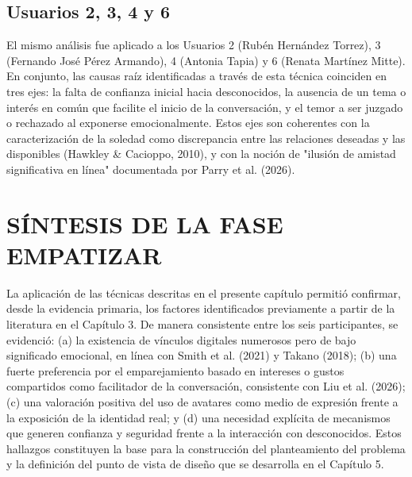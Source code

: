 \subsection{Usuarios 2, 3, 4 y 6}
El mismo análisis fue aplicado a los Usuarios 2 (Rubén Hernández Torrez), 3 (Fernando José Pérez Armando), 4 (Antonia Tapia) y 6 (Renata Martínez Mitte). En conjunto, las causas raíz identificadas a través de esta técnica coinciden en tres ejes: la falta de confianza inicial hacia desconocidos, la ausencia de un tema o interés en común que facilite el inicio de la conversación, y el temor a ser juzgado o rechazado al exponerse emocionalmente. Estos ejes son coherentes con la caracterización de la soledad como discrepancia entre las relaciones deseadas y las disponibles (Hawkley \& Cacioppo, 2010), y con la noción de "ilusión de amistad significativa en línea" documentada por Parry et al. (2026).

\section{SÍNTESIS DE LA FASE EMPATIZAR}
La aplicación de las técnicas descritas en el presente capítulo permitió confirmar, desde la evidencia primaria, los factores identificados previamente a partir de la literatura en el Capítulo 3. De manera consistente entre los seis participantes, se evidenció: (a) la existencia de vínculos digitales numerosos pero de bajo significado emocional, en línea con Smith et al. (2021) y Takano (2018); (b) una fuerte preferencia por el emparejamiento basado en intereses o gustos compartidos como facilitador de la conversación, consistente con Liu et al. (2026); (c) una valoración positiva del uso de avatares como medio de expresión frente a la exposición de la identidad real; y (d) una necesidad explícita de mecanismos que generen confianza y seguridad frente a la interacción con desconocidos. Estos hallazgos constituyen la base para la construcción del planteamiento del problema y la definición del punto de vista de diseño que se desarrolla en el Capítulo 5.